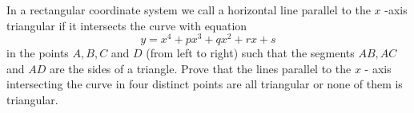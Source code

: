 In a rectangular coordinate system we call a horizontal line parallel to the $x$ -axis triangular if it intersects the curve with equation \[y = x^4 + px^3 + qx^2 + rx + s\] in the points $A,B,C$ and $D$ (from left to right) such that the segments $AB, AC$ and $AD$ are the sides of a triangle. Prove that the lines parallel to the $x$ - axis intersecting the curve in four distinct points are all triangular or none of them is triangular.
